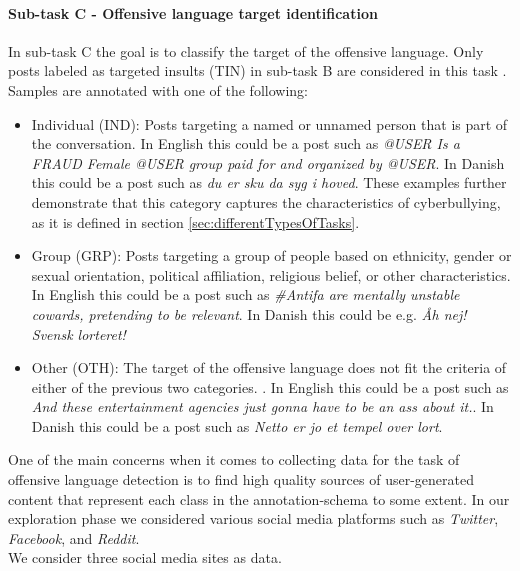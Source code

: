 \documentclass{article}
\begin{document}
\paragraph{Sub-task C - Offensive language target identification}\label{ssec:offensEvalSubC}
In sub-task C the goal is to classify the target of the offensive language. Only posts labeled as targeted insults (TIN) in sub-task B are considered in this task \cite{zampieri2019semeval}. Samples are annotated with one of the following:
\begin{itemize}
 \setlength\itemsep{-1mm}

    \item Individual (IND): Posts targeting a named or unnamed person that is  part of the conversation. In English this could be a post such as \textit{@USER Is a FRAUD Female @USER group paid for and organized by @USER}. In Danish this could be a post such as \textit{\@USER du er sku da syg i hoved}. These examples further demonstrate that this category captures the characteristics of cyberbullying, as it is defined in section \ref{sec:differentTypesOfTasks}.
    \item Group (GRP): Posts targeting a group of people based on ethnicity, gender or sexual orientation, political affiliation, religious belief, or other characteristics. In English this could be a post such as \textit{\#Antifa are mentally unstable cowards, pretending to be relevant}. In Danish this could be e.g. \textit{Åh nej! Svensk lorteret!} \item Other (OTH): The target of the offensive language does not fit the criteria of either of the previous two categories.  \cite{zampieri2019semeval}. In English this could be a post such as \textit{And these entertainment agencies just gonna have to be an ass about it.}. In Danish this could be a post such as \textit{Netto er jo et tempel over lort}.
\end{itemize}

\vspace{3mm}

One of the main concerns when it comes to collecting data for the task of offensive language detection is to find high quality sources of user-generated content that represent each class in the annotation-schema to some extent.
In our exploration phase we considered various social media platforms such as \textit{Twitter}, \textit{Facebook}, and \textit{Reddit}.\\

We consider three social media sites as data.
\end{document}
